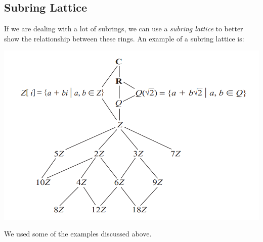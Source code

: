 \documentclass[letterpaper]{article}
\begin{document}
\subsection{Subring Lattice}
If we are dealing with a lot of subrings, we can use a \emph{subring lattice} to better show the relationship between these rings. An example of a subring lattice is: 
\begin{center}
    \includegraphics[scale=0.5]{../assets/lattice.png}
\end{center}
We used some of the examples discussed above.
\end{document}
